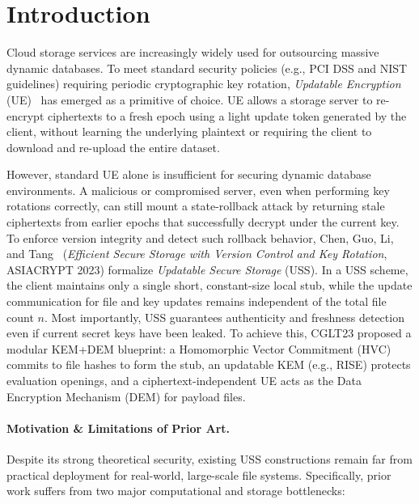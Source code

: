 \section{Introduction}

Cloud storage services are increasingly widely used for outsourcing massive dynamic databases. To meet standard security policies (e.g., PCI DSS and NIST guidelines) requiring periodic cryptographic key rotation, \emph{Updatable Encryption} (UE)~\cite{LT18,EPRS17,BDGJ20,SHINE} has emerged as a primitive of choice. UE allows a storage server to re-encrypt ciphertexts to a fresh epoch using a light update token generated by the client, without learning the underlying plaintext or requiring the client to download and re-upload the entire dataset.

However, standard UE alone is insufficient for securing dynamic database environments. A malicious or compromised server, even when performing key rotations correctly, can still mount a state-rollback attack by returning stale ciphertexts from earlier epochs that successfully decrypt under the current key. To enforce version integrity and detect such rollback behavior, Chen, Guo, Li, and Tang~\cite{CGLT23} (\emph{Efficient Secure Storage with Version Control and Key Rotation}, ASIACRYPT 2023) formalize \emph{Updatable Secure Storage} (USS). In a USS scheme, the client maintains only a single short, constant-size local stub, while the update communication for file and key updates remains independent of the total file count $n$. Most importantly, USS guarantees authenticity and freshness detection even if current secret keys have been leaked. To achieve this, CGLT23 proposed a modular KEM+DEM blueprint: a Homomorphic Vector Commitment (HVC) commits to file hashes to form the stub, an updatable KEM (e.g., RISE) protects evaluation openings, and a ciphertext-independent UE acts as the Data Encryption Mechanism (DEM) for payload files.

\paragraph{Motivation \& Limitations of Prior Art.}
Despite its strong theoretical security, existing USS constructions remain far from practical deployment for real-world, large-scale file systems. Specifically, prior work suffers from two major computational and storage bottlenecks:

